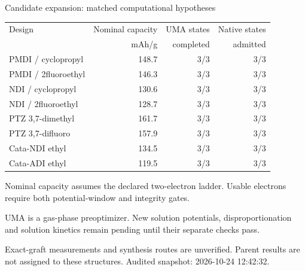 \begin{frame}{Candidate expansion: matched computational hypotheses}
\scriptsize\centering\renewcommand{\arraystretch}{1.1}
\begin{tabular}{@{}p{4.8cm}rrr@{}}\toprule
Design & Nominal capacity & UMA states & Native states \\
& mAh/g & completed & admitted \\ \midrule
PMDI / cyclopropyl & 148.7 & 3/3 & 3/3 \\
PMDI / 2fluoroethyl & 146.3 & 3/3 & 3/3 \\
NDI / cyclopropyl & 130.6 & 3/3 & 3/3 \\
NDI / 2fluoroethyl & 128.7 & 3/3 & 3/3 \\
PTZ 3,7-dimethyl & 161.7 & 3/3 & 3/3 \\
PTZ 3,7-difluoro & 157.9 & 3/3 & 3/3 \\
Cata-NDI ethyl & 134.5 & 3/3 & 3/3 \\
Cata-ADI ethyl & 119.5 & 3/3 & 3/3 \\
\bottomrule\end{tabular}\par\vspace{1.5ex}\raggedright
\footnotesize Nominal capacity assumes the declared two-electron ladder. Usable electrons require both potential-window and integrity gates.
\par\vspace{1ex}UMA is a gas-phase preoptimizer. New solution potentials, disproportionation and solution kinetics remain pending until their separate checks pass.
\par\vspace{1ex}Exact-graft measurements and synthesis routes are unverified. Parent results are not assigned to these structures.
\vfill\scriptsize Audited snapshot: 2026-10-24 12:42:32.
\end{frame}

